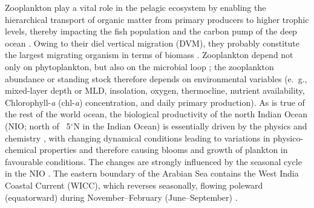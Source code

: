 \documentclass[authoryear,review,11pt]{elsarticle}
\newcommand{\chla}{chl-{\emph{a}}}
\begin{document}
Zooplankton play a vital role in the pelagic ecosystem by enabling the hierarchical transport of organic matter from primary producers to higher trophic levels, thereby impacting the fish population \citep{ohman2001density} and the carbon pump of the deep ocean \citep{le2016global}.  Owing to their diel vertical migration (DVM), they probably constitute the largest migrating organism in terms of biomass \citep{hays2003review}. Zooplankton depend not only on phytoplankton, but also on the microbial loop \citep{azam1983microbial}; the zooplankton abundance or standing stock therefore depends on environmental variables (e.~g., mixed-layer depth or MLD, insolation, oxygen, thermocline, nutrient availability, Chlorophyll-\emph{a} (\chla) concentration, and daily primary production). As is true of the rest of the world ocean, the biological productivity of the north Indian Ocean (NIO; north of ~5$^{\circ}$N in the Indian Ocean) is essentially driven by the physics and chemistry \citep[see, for example,][]{subrahmanyan1959studiespart2, ryther1966primary, banse1968hydrography,  nair1970primary, qasim1977biological, banse1995zooplankton, levy2007basin, mccreary2009biophysical, vijith2016consequences, shankar2016inhibition, shankar2019role, amol2020modulation}, with changing dynamical conditions leading to variations in physico-chemical properties and therefore causing blooms and growth of plankton in favourable conditions. The changes are strongly influenced by the seasonal cycle in the NIO \citep{banse1968hydrography, mccreary1996four, mccreary2009biophysical, levy2007basin, shankar2019role, aparna2022seasonal}. The eastern boundary of the Arabian Sea contains the West India Coastal Current (WICC), which reverses seasonally, flowing poleward (equatorward) during November--February (June--September) \citep{banse1968hydrography, shetye1990hydrography, shetye19911517, mccreary1993numerical, shankar1997dynamics, shankar2002monsoon, vijith2022circulation}. 

\end{document}
